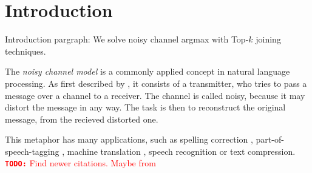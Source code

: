 \documentclass[11pt,a4paper]{report}
\title{\mytitle}
\author{
  \myname \\
  \small{\myaddress} \\
  \small{\texttt{\href{mailto:\mymail}{\nolinkurl{\mymail}}}}
}
\date{\today}
\newenvironment{draft}{\color{draftcolor}}{}
\newcommand{\todo}[1]{\textcolor{red}{{\footnotesize\textbf{\texttt{TODO:}}} #1}}
\begin{document}
\maketitle

\vspace*{\fill}
\begin{minipage}{\linewidth} %
  \begin{abstract}
    \todo{Abstract.}
  \end{abstract}

  \vspace{5em}

  \begin{abstract}
    \todo{Übersetzen nach deutsch.}
  \end{abstract}
\end{minipage}
\vspace*{\fill}

\tableofcontents

\chapter{Introduction}

\begin{draft}
Introduction pargraph: We solve noisy channel argmax with Top-$k$ joining
techniques.
\end{draft}

The \emph{noisy channel model} is a commonly applied concept in natural language
processing.
As first described by \cite{Shannon1948}, it consists of a transmitter, who
tries to pass a message over a channel to a receiver.
The channel is called noisy, because it may distort the message in any way.
The task is then to reconstruct the original message, from the recieved
distorted one.

This metaphor has many applications, such as spelling correction
\parencite{JurafskyMartin2009,Manning2008,Kernighan1990,Mays1991},
part-of-speech-tagging \parencite{Church1988}, machine translation
\parencite{Brown1990}, speech recognition or text compression.
\todo{Find newer citations. Maybe from \cite{Bickel2005}}
\end{document}
